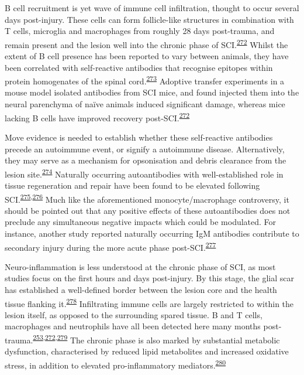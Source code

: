 \documentclass[
]{article}
\begin{document}
B cell recruitment is yet wave of immune cell infiltration, thought to occur several days post-injury.
These cells can form follicle-like structures in combination with T cells, microglia and macrophages from roughly 28 days post-trauma, and remain present and the lesion well into the chronic phase of SCI.\textsuperscript{\protect\hyperlink{ref-ankeny_b_2009}{272}}
Whilst the extent of B cell presence has been reported to vary between animals, they have been correlated with self-reactive antibodies that recognise epitopes within protein homogenates of the spinal cord.\textsuperscript{\protect\hyperlink{ref-sun_gammadelta_2017}{273}}
Adoptive transfer experiments in a mouse model isolated antibodies from SCI mice, and found injected them into the neural parenchyma of naïve animals induced significant damage, whereas mice lacking B cells have improved recovery post-SCI.\textsuperscript{\protect\hyperlink{ref-ankeny_b_2009}{272}}

Move evidence is needed to establish whether these self-reactive antibodies precede an autoimmune event, or signify a autoimmune disease.
Alternatively, they may serve as a mechanism for opsonisation and debris clearance from the lesion site.\textsuperscript{\protect\hyperlink{ref-nagele_natural_2013}{274}}
Naturally occurring autoantibodies with well-established role in tissue regeneration and repair have been found to be elevated following SCI.\textsuperscript{\protect\hyperlink{ref-palmers_antibody_2016}{275},\protect\hyperlink{ref-arevalo-martin_elevated_2018}{276}}
Much like the aforementioned monocyte/macrophage controversy, it should be pointed out that any positive effects of these autoantibodies does not preclude any simultaneous negative impacts which could be modulated.
For instance, another study reported naturally occurring IgM antibodies contribute to secondary injury during the more acute phase post-SCI.\textsuperscript{\protect\hyperlink{ref-narang_natural_2017}{277}}

Neuro-inflammation is less understood at the chronic phase of SCI, as most studies focus on the first hours and days post-injury.
By this stage, the glial scar has established a well-defined border between the lesion core and the health tissue flanking it.\textsuperscript{\protect\hyperlink{ref-sofroniew_astrocytes_2010}{278}}
Infiltrating immune cells are largely restricted to within the lesion itself, as opposed to the surrounding spared tissue.
B and T cells, macrophages and neutrophils have all been detected here many months post-trauma.\textsuperscript{\protect\hyperlink{ref-beck_quantitative_2010}{253},\protect\hyperlink{ref-ankeny_b_2009}{272},\protect\hyperlink{ref-pruss_non-resolving_2011}{279}}
The chronic phase is also marked by substantial metabolic dysfunction, characterised by reduced lipid metabolites and increased oxidative stress, in addition to elevated pro-inflammatory mediators.\textsuperscript{\protect\hyperlink{ref-dulin_licofelone_2013}{280}}
\end{document}
